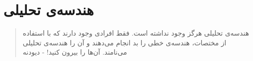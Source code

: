 \chapter{هندسه‌ی تحلیلی}
\thispagestyle{empty}

\begin{quote}
	{\lotus
		هندسه‌ی تحلیلی هرگز وجود نداشته است. فقط افرادی وجود دارند که با استفاده از مختصات، هندسه‌ی خطی را بد انجام می‌دهند و آن را هندسه‌ی تحلیلی می‌نامند. آن‌ها را بیرون کنید! \quad - دیودنه%
	}
\end{quote}
